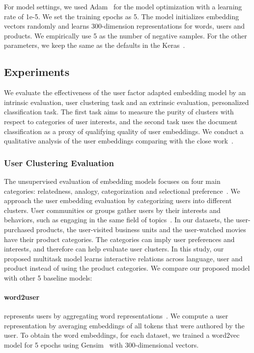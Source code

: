 For model settings, we used Adam~\cite{kingma2014adam} for the model optimization with a learning rate of 1e-5. We set the training epochs as 5. The model initializes embedding vectors randomly and learns 300-dimension representations for words, users and products. We empirically use 5 as the number of negative samples. For the other parameters, we keep the same as the defaults in the Keras~\cite{chollet2015keras}. 


\subsection{Experiments}
\label{chap4:subsec:exp2}

We evaluate the effectiveness of the user factor adapted embedding model by an intrinsic evaluation, user clustering task and an extrinsic evaluation, personalized classification task. The first task aims to measure the purity of clusters with respect to categories of user interests, and the second task uses the document classification as a proxy of qualifying quality of user embeddings. We conduct a qualitative analysis of the user embeddings comparing with the close work~\cite{amir2017quantifying}.


\subsubsection{User Clustering Evaluation}

The unsupervised evaluation of embedding models focuses on four main categories: relatedness, analogy, categorization and selectional preference~\cite{schnabel2015evaluation}.
We approach the user embedding evaluation by categorizing users into different clusters. 
User communities or groups gather users by their interests and behaviors, such as engaging in the same field of topics~\cite{benton2016learning, yang2017overcoming}.
In our datasets, the user-purchased products, the user-visited business units and the user-watched movies have their product categories. 
The categories can imply user preferences and interests, and therefore can help evaluate user clusters.
In this study, our proposed multitask model learns interactive relations across language, user and product instead of using the product categories. We compare our proposed model with other 5 baseline models:

\paragraph{word2user} 
represents users by aggregating word representations~\cite{benton2016learning}. We compute a user representation by averaging embeddings of all tokens that were authored by the user. To obtain the word embeddings, for each dataset, we trained a word2vec model for 5 epochs using Gensim~\cite{rehurek2010software} with 300-dimensional vectors.


